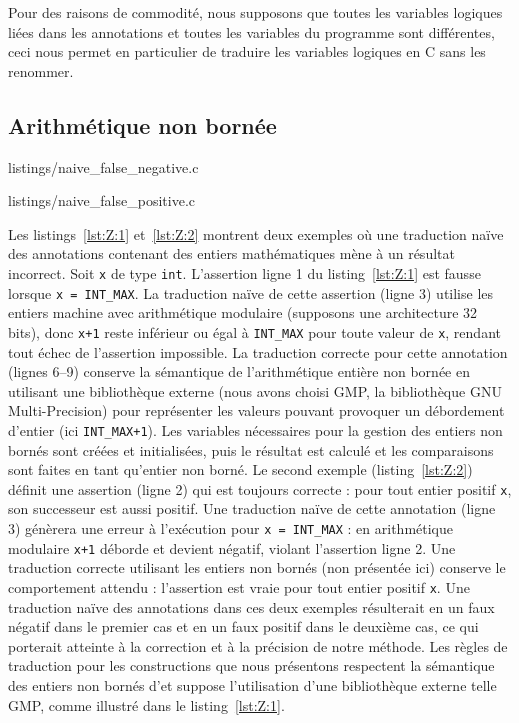 Pour des raisons de commodité, nous supposons que toutes les variables logiques
liées dans les annotations et toutes les variables du programme sont
différentes, ceci nous permet en particulier de traduire les variables logiques
en C sans les renommer.


\subsection{Arithmétique non bornée}
\label{sec:integers}



                {listings/naive_false_negative.c}


                {listings/naive_false_positive.c}


Les listings~\ref{lst:Z:1} et~\ref{lst:Z:2} montrent deux exemples où
une traduction naïve des annotations contenant des entiers mathématiques mène
à un résultat incorrect.
Soit \lstinline'x' de type \lstinline'int'.
L'assertion ligne 1 du listing~\ref{lst:Z:1} est fausse lorsque
\lstinline'x = INT_MAX'.
La traduction naïve de cette assertion (ligne 3) utilise les entiers machine
avec arithmétique modulaire (supposons une architecture 32 bits), donc
\lstinline'x+1' reste inférieur ou égal à \lstinline'INT_MAX' pour toute valeur
de \lstinline'x', rendant tout échec de l'assertion impossible.
La traduction correcte pour cette annotation (lignes 6--9) conserve la
sémantique de l'arithmétique entière non bornée en utilisant une bibliothèque
externe (nous avons choisi GMP, la bibliothèque GNU Multi-Precision) pour
représenter les valeurs pouvant provoquer un débordement d'entier (ici
\lstinline'INT_MAX+1').
Les variables nécessaires pour la gestion des entiers non bornés sont créées et
initialisées, puis le résultat est calculé et les comparaisons sont faites en
tant qu'entier non borné.
Le second exemple (listing~\ref{lst:Z:2}) définit une assertion \eacsl (ligne 2)
qui est toujours correcte : pour tout entier positif \lstinline'x', son
successeur est aussi positif.
Une traduction naïve de cette annotation (ligne 3) génèrera une erreur à
l'exécution pour \lstinline'x = INT_MAX' : en arithmétique modulaire
\lstinline'x+1' déborde et devient négatif, violant l'assertion ligne 2.
Une traduction correcte utilisant les entiers non bornés (non présentée ici)
conserve le comportement attendu : l'assertion est vraie pour tout entier
positif \lstinline'x'.
Une traduction naïve des annotations dans ces deux exemples résulterait en un
faux négatif dans le premier cas et en un faux positif dans le deuxième cas, ce
qui porterait atteinte à la correction et à la précision de notre méthode.
Les règles de traduction pour les constructions \eacsl que nous présentons
respectent la sémantique des entiers non bornés d'\eacsl et suppose
l'utilisation d'une bibliothèque externe telle GMP, comme illustré dans le
listing~\ref{lst:Z:1}.



